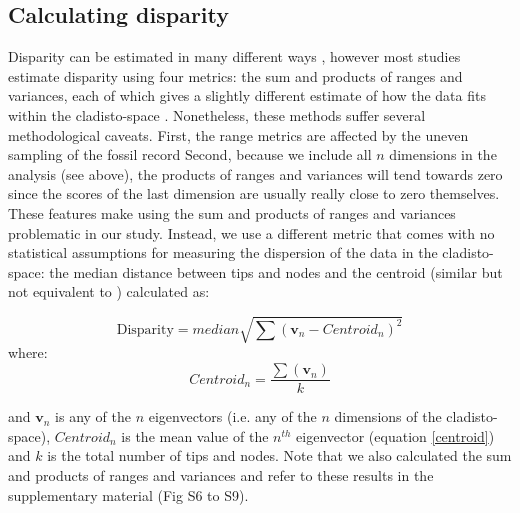 \documentclass[10pt,letterpaper]{article}
\begin{document}
\subsection{Calculating disparity}
Disparity can be estimated in many different ways \citep[e.g.][]{Wills1994,Ciampaglio2004,thorneresetting2011,hopkinsdecoupling2013,huang2015origins}, however most studies estimate disparity using four metrics: the sum and products of ranges and variances, each of which gives a slightly different estimate of how the data fits within the cladisto-space \citep{Foote01071994,Wills1994,brusatte50,Brusatte12092008,cisneros2010,thorneresetting2011,prentice2011,brusattedinosaur2012,toljagictriassic-jurassic2013,ruta2013,bentonmodels2014,bensonfaunal2014}.
Nonetheless, these methods suffer several methodological caveats.
First, the range metrics are affected by the uneven sampling of the fossil record \citep{Butler2012}
Second, because we include all $n$ dimensions in the analysis (see above), the products of ranges and variances will tend towards zero since the scores of the last dimension are usually really close to zero themselves. 
These features make using the sum and products of ranges and variances problematic in our study.
Instead, we use a different metric that comes with no statistical assumptions for measuring the dispersion of the data in the cladisto-space: the median distance between tips and nodes and the centroid (similar but not equivalent to \citealt{Wills1994,kornextinction2013,huang2015origins}) calculated as:

\begin{equation}
   \text{Disparity}=median{\displaystyle\sqrt{\sum{(\mathbf{v}_{n}-Centroid_{n})^2}}}
    \label{disparity}
\end{equation}
where:
\begin{equation}
    Centroid_{n}=\frac{\displaystyle\sum(\mathbf{v}_{n})}{k} 
    \label{centroid}
\end{equation}

\noindent
and $\mathbf{v}_{n}$ is any of the $n$ eigenvectors (i.e. any of the $n$ dimensions of the cladisto-space), $Centroid_{n}$ is the mean value of the $n^{th}$ eigenvector (equation \ref{centroid}) and $k$ is the total number of tips and nodes.
Note that we also calculated the sum and products of ranges and variances and refer to these results in the supplementary material (Fig S6 to S9). %
\end{document}

